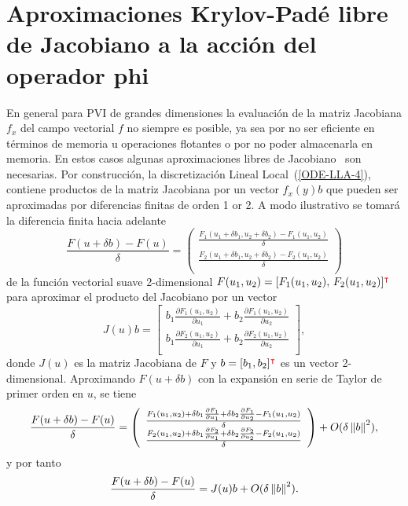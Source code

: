 \section{Aproximaciones Krylov-Padé libre de Jacobiano a la acción del operador phi} \label{section:fj-krylov-pade-approx}
En general para PVI de grandes dimensiones la evaluación de la matriz Jacobiana $f_x$ del campo vectorial $f$ no siempre es posible, ya sea por no ser eficiente en términos de memoria u operaciones flotantes o por no poder almacenarla en memoria. En estos casos algunas aproximaciones libres de Jacobiano~\cite{al2009complex,knoll2004jacobian} son necesarias. Por construcción, la discretización Lineal Local~(\ref{ODE-LLA-4}), contiene productos de la matriz Jacobiana por un vector $f_x(y)b$ que pueden ser aproximadas por diferencias finitas de orden 1 or 2. A modo ilustrativo se tomará la diferencia finita hacia adelante
\begin{equation*}
	\frac{F(u+\delta b)-F(u)}{\delta} =  \left(\begin{array}{c}
		\frac{F_1(u_1+\delta b_1,u_2+\delta b_2)-F_1(u_1,u_2)}{\delta}\\
		\frac{F_2(u_1+\delta b_1,u_2+\delta b_2)-F_2(u_1,u_2)}{\delta}\\
	\end{array}\right)
\end{equation*}
de la función vectorial suave 2-dimensional $F(u_1,u_2)=[F_1(u_1,u_2),\,F_2(u_1,u_2)]^{\textcolor{red}{\intercal}}$ para aproximar el producto del Jacobiano por un vector \begin{equation*}
	J(u)b = \left[\begin{array}{c}
		b_1\frac{\partial F_1(u_1,u_2)}{\partial u_1} + b_2\frac{\partial F_1(u_1,u_2)}{\partial u_2}\\
		b_1\frac{\partial F_2(u_1,u_2)}{\partial u_1} + b_2\frac{\partial F_2(u_1,u_2)}{\partial u_2}\\
	\end{array}\right],
\end{equation*}
donde $J(u)$ es la matriz Jacobiana de $F$ y $b=[b_1,b_2]^{\textcolor{red}{\intercal}}$ es un vector 2-dimensional. Aproximando $F(u+\delta b)$ con la expansión en serie de Taylor de primer orden en $u$, se tiene
\begin{equation*}
	\frac{F(u+\delta b)-F(u)}{\delta} =  \left(\begin{array}{c}
		\frac{F_1(u_1,u_2) + \delta b_1 \frac{\partial F_1}{\partial u_1} + \delta b_2 \frac{\partial F_1}{\partial u_2} -F_1(u_1,u_2)}{\delta}\\
		\frac{F_2(u_1,u_2) + \delta b_1 \frac{\partial F_2}{\partial u_1} + \delta b_2 \frac{\partial F_2}{\partial u_2} -F_2(u_1,u_2)}{\delta}\\
	\end{array}\right)  + O(\delta\left\lVert b \right\rVert^2),
\end{equation*}
y por tanto
\begin{equation*}
	\frac{F(u+\delta b)-F(u)}{\delta} =  J(u)b + O(\delta\left\lVert b \right\rVert^2).
\end{equation*}

